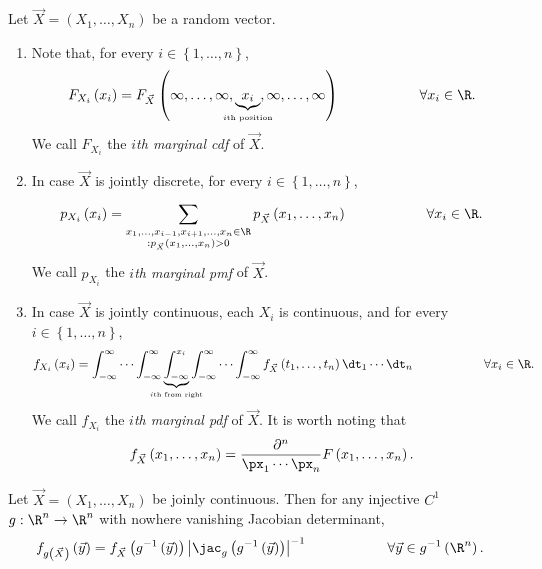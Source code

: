 \documentclass[stat333]{subfiles}
\begin{document}
    \np Let $\vec{X} = \left( X_1,\ldots,X_n \right)$ be a random vector.
    \begin{enumerate}
        \item Note that, for every $i\in\left\lbrace 1,\ldots,n \right\rbrace$,
            \begin{equation*}
                F_{X_i}\left( x_i \right) = F_{\vec{X}}\left( \infty,\ldots,\infty,\underbrace{x_i}_{\clap{\text{\tiny$i$th position}}},\infty,\ldots,\infty \right)  \hspace{2cm}\forall x_i\in\R.
            \end{equation*}
            We call $F_{X_i}$ the \emph{$i$th marginal cdf} of $\vec{X}$.
        \item In case $\vec{X}$ is jointly discrete, for every $i\in\left\lbrace 1,\ldots,n \right\rbrace$,
            \begin{equation*}
                p_{X_i}\left( x_i \right) = \sum^{}_{\substack{x_1,\ldots,x_{i-1},x_{i+1},\ldots,x_n\in\R\\:p_{\vec{X}}\left( x_1,\ldots,x_n \right) > 0}} p_{\vec{X}}\left( x_1,\ldots,x_n \right) \hspace{2cm}\forall x_i\in\R. 
            \end{equation*}
            We call $p_{X_i}$ the \emph{$i$th marginal pmf} of $\vec{X}$.
        \item In case $\vec{X}$ is jointly continuous, each $X_i$ is continuous, and for every $i\in\left\lbrace 1,\ldots,n \right\rbrace$,
            \begin{equation*}
                f_{X_i}\left( x_i \right) = \int^{\infty}_{-\infty} \cdots\int^{\infty}_{-\infty} \underbrace{\int^{x_i}_{-\infty}}_{\clap{\text{\tiny$i$th from right}}} \int^{\infty}_{-\infty} \cdots \int^{\infty}_{-\infty} f_{\vec{X}}\left(t_1,\ldots,t_n \right) \dt_1\cdots\dt_n \hspace{2cm}\forall x_i\in\R.
            \end{equation*}
            We call $f_{X_i}$ the \emph{$i$th marginal pdf} of $\vec{X}$. It is worth noting that
            \begin{equation*}
                f_{\vec{X}}\left( x_1,\ldots,x_n \right) = \frac{\partial^n}{\px_1\cdots\px_n}F\left( x_1,\ldots,x_n \right) .
            \end{equation*}
    \end{enumerate}

    \begin{prop}{}
        Let $\vec{X} = \left( X_1,\ldots,X_n \right)$ be joinly continuous. Then for any injective $C^1$ $g:\R^n\to\R^n$ with nowhere vanishing Jacobian determinant,
        \begin{equation*}
            f_{g\left( \vec{X} \right) }\left( \vec{y} \right) = f_{\vec{X}}\left( g^{-1} \left( \vec{y} \right)  \right) \left| \jac_g\left( g^{-1} \left( \vec{y} \right)  \right)  \right|^{-1} \hspace{2cm}\forall \vec{y}\in g^{-1} \left( \R^n \right) .  
        \end{equation*}
    \end{prop}
\end{document}
